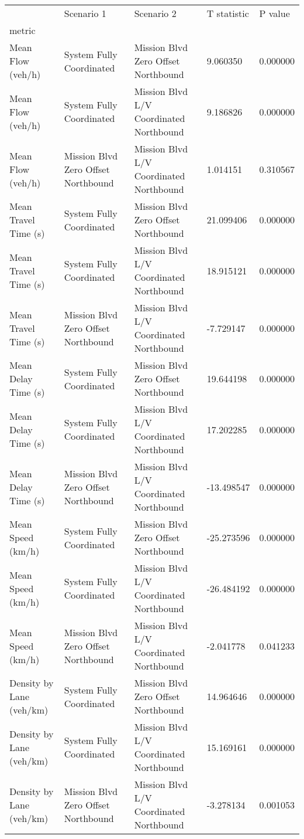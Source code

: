 \begin{tabular}{lllll}
\toprule
 & Scenario 1 & Scenario 2 & T statistic & P value \\
metric &  &  &  &  \\
\midrule
Mean Flow (veh/h) & System Fully Coordinated & Mission Blvd Zero Offset Northbound & 9.060350 & 0.000000 \\
Mean Flow (veh/h) & System Fully Coordinated & Mission Blvd L/V Coordinated Northbound & 9.186826 & 0.000000 \\
Mean Flow (veh/h) & Mission Blvd Zero Offset Northbound & Mission Blvd L/V Coordinated Northbound & 1.014151 & 0.310567 \\
Mean Travel Time (s) & System Fully Coordinated & Mission Blvd Zero Offset Northbound & 21.099406 & 0.000000 \\
Mean Travel Time (s) & System Fully Coordinated & Mission Blvd L/V Coordinated Northbound & 18.915121 & 0.000000 \\
Mean Travel Time (s) & Mission Blvd Zero Offset Northbound & Mission Blvd L/V Coordinated Northbound & -7.729147 & 0.000000 \\
Mean Delay Time (s) & System Fully Coordinated & Mission Blvd Zero Offset Northbound & 19.644198 & 0.000000 \\
Mean Delay Time (s) & System Fully Coordinated & Mission Blvd L/V Coordinated Northbound & 17.202285 & 0.000000 \\
Mean Delay Time (s) & Mission Blvd Zero Offset Northbound & Mission Blvd L/V Coordinated Northbound & -13.498547 & 0.000000 \\
Mean Speed (km/h) & System Fully Coordinated & Mission Blvd Zero Offset Northbound & -25.273596 & 0.000000 \\
Mean Speed (km/h) & System Fully Coordinated & Mission Blvd L/V Coordinated Northbound & -26.484192 & 0.000000 \\
Mean Speed (km/h) & Mission Blvd Zero Offset Northbound & Mission Blvd L/V Coordinated Northbound & -2.041778 & 0.041233 \\
Density by Lane (veh/km) & System Fully Coordinated & Mission Blvd Zero Offset Northbound & 14.964646 & 0.000000 \\
Density by Lane (veh/km) & System Fully Coordinated & Mission Blvd L/V Coordinated Northbound & 15.169161 & 0.000000 \\
Density by Lane (veh/km) & Mission Blvd Zero Offset Northbound & Mission Blvd L/V Coordinated Northbound & -3.278134 & 0.001053 \\

\end{tabular}
